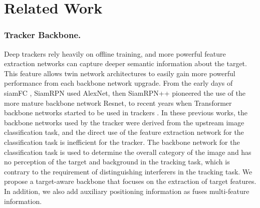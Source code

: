 \documentclass[letterpaper]{article} \usepackage{aaai23}  \usepackage{times}  \usepackage{helvet}  \usepackage{courier}  \usepackage[hyphens]{url}  \usepackage{graphicx} \urlstyle{rm} \def\UrlFont{\rm}  \usepackage{natbib}  \usepackage{caption} \frenchspacing  \setlength{\pdfpagewidth}{8.5in}  \setlength{\pdfpageheight}{11in}  \usepackage{algorithm}
\begin{document}
\section{Related Work}

\subsubsection{Tracker Backbone.}
Deep trackers rely heavily on offline training, and more powerful feature extraction networks can capture deeper semantic information about the target. This feature allows twin network architectures to easily gain more powerful performance from each backbone network upgrade. From the early days of siamFC \cite{simafc}, SiamRPN \cite{siamrpn} used AlexNet, then SiamRPN++ \cite{siamrpn++} pioneered the use of the more mature backbone network Resnet, to recent years when Transformer backbone networks started to be used in trackers \cite{swintrack}. In these previous works, the backbone networks used by the tracker were derived from the upstream image classification task, and the direct use of the feature extraction network for the classification task is inefficient for the tracker. The backbone network for the classification task is used to determine the overall category of the image and has no perception of the target and background in the tracking task, which is contrary to the requirement of distinguishing interferers in the tracking task. We propose a target-aware backbone that focuses on the extraction of target features. In addition, we also add auxiliary positioning information as \cite{ZHANG201832} fuses multi-feature information.
\end{document}
